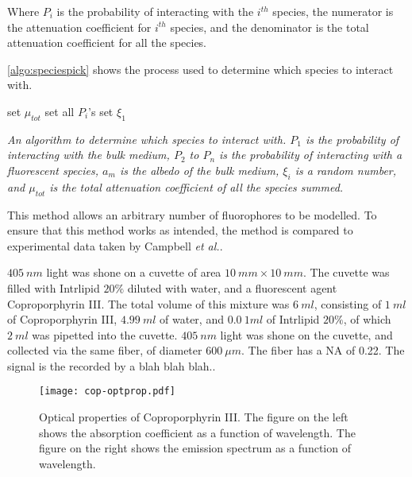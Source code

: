 Where $P_i$ is the probability of interacting with the $i^{th}$ species, the numerator is the attenuation coefficient for $i^{th}$ species, and the denominator is the total attenuation coefficient for all the species.

\cref{algo:speciespick} shows the process used to determine which species to interact with.

\begin{center}
\begin{algorithm}[H]
\SetAlgoLined
  set $\mu_{tot}$\;
  set all $P_i$'s\;
  set $\xi_1$\;
\
\caption{\textit{An algorithm to determine which species to interact with. $P_1$ is the probability of interacting with the bulk medium, $P_2$ to $P_n$ is the probability of interacting with a fluorescent species, $a_m$ is the albedo of the bulk medium, $\xi_i$ is a random number, and $\mu_{tot}$ is the total attenuation coefficient of all the species summed.}}
\label{algo:speciespick}
\end{algorithm}
\end{center}

This method allows an arbitrary number of fluorophores to be modelled.
To ensure that this method works as intended, the method is compared to experimental data taken by Campbell \textit{et al.}.

$405~nm$ light was shone on a cuvette of area $10~mm \times 10~mm$.
The cuvette was filled with Intrlipid $20\%$ diluted with water, and a fluorescent agent Coproporphyrin III.
The total volume of this mixture was $6~ml$, consisting of $1~ml$ of Coproporphyrin III, $4.99~ml$ of water, and $0.0~1ml$ of Intrlipid $20\%$, of which $2~ml$ was pipetted into the cuvette.
$405~nm$ light was shone on the cuvette, and collected via the same fiber, of diameter $600~\mu m$.
The fiber has a NA of 0.22.
The signal is the recorded by a blah blah blah..

\begin{figure}[!htpb]
	\centering
	\texttt{[image: cop-optprop.pdf]}
	\caption{Optical properties of Coproporphyrin III. The figure on the left shows the absorption coefficient as a function of wavelength. The figure on the right shows the emission spectrum as a function of wavelength.}
	\label{fig:coporiii}
\end{figure}

